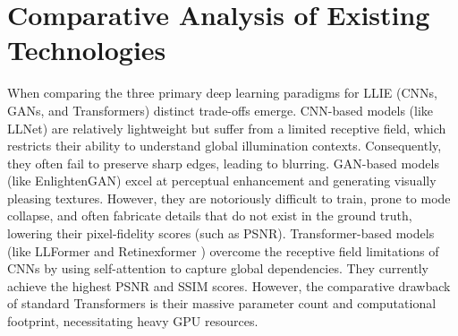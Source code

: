 \documentclass[12pt, a4paper]{report}
\begin{document}
\section{Comparative Analysis of Existing Technologies}
When comparing the three primary deep learning paradigms for LLIE (CNNs, GANs, and Transformers) distinct trade-offs emerge. CNN-based models (like LLNet) are relatively lightweight but suffer from a limited receptive field, which restricts their ability to understand global illumination contexts. Consequently, they often fail to preserve sharp edges, leading to blurring. GAN-based models (like EnlightenGAN) excel at perceptual enhancement and generating visually pleasing textures. However, they are notoriously difficult to train, prone to mode collapse, and often fabricate details that do not exist in the ground truth, lowering their pixel-fidelity scores (such as PSNR). Transformer-based models (like LLFormer \cite{wang2023llformer} and Retinexformer \cite{cai2023retinexformer}) overcome the receptive field limitations of CNNs by using self-attention to capture global dependencies. They currently achieve the highest PSNR and SSIM scores. However, the comparative drawback of standard Transformers is their massive parameter count and computational footprint, necessitating heavy GPU resources.
\end{document}
